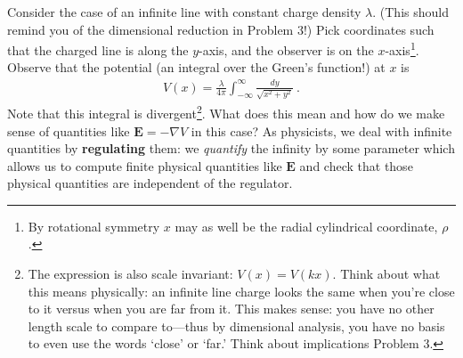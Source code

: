\documentclass[12pt]{article}
\numberwithin{equation}{section}    %
\renewcommand{\vec}[1]{\mathbf{#1}} %
\begin{document}
Consider the case of an infinite line  with constant charge density $\lambda$. (This should remind you of the dimensional reduction in Problem 3!) Pick coordinates such that the charged line is along the $y$-axis, and the observer is on the $x$-axis\footnote{By rotational symmetry $x$ may as well be the radial cylindrical coordinate, $\rho$.}. Observe that the potential (an integral over the Green's function!) at $x$ is
\begin{align}
	V(x) = \frac{\lambda}{4\pi} \int_{-\infty}^\infty \frac{dy}{\sqrt{x^2+y^2}} \ .
	\label{eq:Vx:1d}
\end{align}
Note that this integral is divergent\footnote{The expression is also scale invariant: $V(x) = V(kx)$. Think about what this means physically: an infinite line charge looks the same when you're close to it versus when you are far from it. This makes sense: you have no other length scale to compare to---thus by dimensional analysis, you have no basis to even use the words `close' or `far.' Think about implications Problem 3.}. What does this mean and how do we make sense of quantities like $\vec E = -\nabla V$ in this case? As physicists, we deal with infinite quantities by \textbf{regulating} them: we \emph{quantify} the infinity by some parameter which allows us to compute finite physical quantities like $\vec E$ and check that those physical quantities are independent of the regulator.
\end{document}
